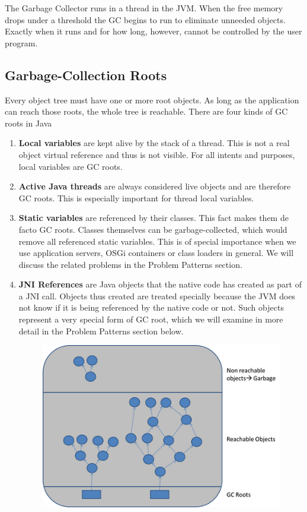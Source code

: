 \documentclass[11pt,a4paper]{article}
\begin{document}
The Garbage Collector runs in a thread in the JVM. When the free memory drops under a threshold the GC begins to run to eliminate unneeded objects. Exactly when it runs and for how long, however, cannot be controlled by the user program.

\subsection*{Garbage-Collection Roots}
Every object tree must have one or more root objects. As long as the application can reach those roots, the whole tree is reachable. There are four kinds of GC roots in Java
\begin{enumerate}
 \item \textbf{Local variables} are kept alive by the stack of a thread. This is not a real object virtual reference and thus is not visible. For all intents and purposes, local variables are GC roots.
 \item \textbf{Active Java threads} are always considered live objects and are therefore GC roots. This is especially important for thread local variables.
 \item \textbf{Static variables} are referenced by their classes. This fact makes them de facto GC roots. Classes themselves can be garbage-collected, which would remove all referenced static variables. This is of special importance when we use application servers, OSGi containers or class loaders in general. We will discuss the related problems in the Problem Patterns section.
 \item \textbf{JNI References} are Java objects that the native code has created as part of a JNI call. Objects thus created are treated specially because the JVM does not know if it is being referenced by the native code or not. Such objects represent a very special form of GC root, which we will examine in more detail in the Problem Patterns section below.
  \begin{figure}[H]
 \begin{center}
   \includegraphics[scale=1.3]{gc.png}
 
 \end{center}
 \end{figure}
\end{enumerate}
\end{document}
